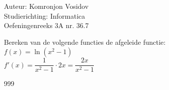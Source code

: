 \documentclass[a4paper]{article}
\begin{document}
	
	\noindent \large Auteur: Komronjon Vosidov \\
	\noindent \large Studierichting: Informatica\\
	\noindent \large Oefeningenreeks 3A nr. 36.7\\
	
	\medskip
	
	\normalsize
	Bereken van de volgende functies de afgeleide functie:\\
	
	$f(x) = \ln(x^2 - 1)$\\
	
	$f'(x) = \dfrac{1}{x^2 - 1} \cdot 2x = \dfrac{2x}{x^2 - 1} $
	
	
\begin{thebibliography}{999}
\end{thebibliography}		
\end{document}
